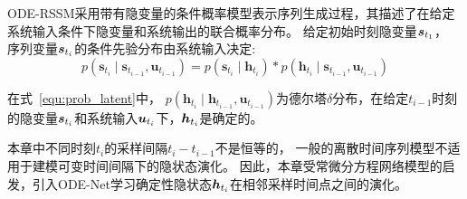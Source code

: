 
ODE-RSSM采用带有隐变量的条件概率模型表示序列生成过程，其描述了在给定系统输入条件下隐变量和系统输出的联合概率分布。
给定初始时刻隐变量$\boldsymbol{s}_{t_1}$， 序列变量$\boldsymbol{s}_{t_i}$的条件先验分布由系统输入决定:
\begin{equation}
p\left(\boldsymbol{s}_{t_{i}} \mid \boldsymbol{s}_{t_{i-1}}, \boldsymbol{u}_{t_{i-1}}\right)=p\left(\boldsymbol{s}_{t_{i}} \mid \boldsymbol{h}_{t_{i}}\right)*
p\left(\boldsymbol{h}_{t_{i}} \mid \boldsymbol{s}_{t_{i-1}}, \boldsymbol{u}_{t_{i-1}}\right)
\label{equ:prob_latent}
\end{equation}

在式~\eqref{equ:prob_latent}中， $p\left(\boldsymbol{h}_{t_{i}} \mid \boldsymbol{h}_{t_{i-1}}, \boldsymbol{u}_{t_{i-1}}\right)$为德尔塔$\delta$分布，在给定$t_{i-1}$时刻的隐变量$\boldsymbol{s}_{t_i}$和系统输入$\boldsymbol{u}_{t_i}$下，$\boldsymbol{h}_{t_i}$是确定的。

本章中不同时刻$t_i$的采样间隔$t_i - t_{i-1}$不是恒等的，
一般的离散时间序列模型不适用于建模可变时间间隔下的隐状态演化。
因此，本章受常微分方程网络模型\cite{chen2018neuralode,Rubanova2019}的启发，引入ODE-Net学习确定性隐状态$\boldsymbol{h}_{t_i}$在相邻采样时间点之间的演化。

